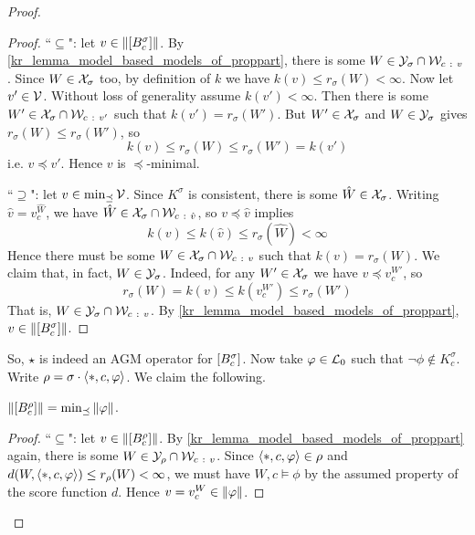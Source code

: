 \begin{proof}
\begin{proof}
            ``$\subseteq$": let $v \in \|{\left[{B^\sigma_c}\right]}\|$. By
            \cref{kr_lemma_model_based_models_of_proppart}, there is some $W \in
            \Y_\sigma \cap \W_{c\ :\  v}$. Since $W \in \mathcal{X}_\sigma$ too, by
            definition of $k$ we have $k(v) \le r_\sigma(W) < \infty$. Now let
            $v' \in \mathcal{V}$. Without loss of generality assume $k(v') < \infty$.
            Then there is some $W' \in \mathcal{X}_\sigma \cap \mathcal{W}_{c\ :\  v'}$ such that
            $k(v') = r_\sigma(W')$. But $W' \in \mathcal{X}_\sigma$ and $W \in
            \mathcal{Y}_\sigma$ gives $r_\sigma(W) \le r_\sigma(W')$, so
            \[
                k(v) \le r_\sigma(W) \le r_\sigma(W') = k(v')
            \]
            i.e. $v \preceq v'$. Hence $v$ is $\preceq$-minimal.

            ``$\supseteq$": let $v \in \min_{\preceq}\mathcal{V}$. Since $K^\sigma$
            is consistent, there is some $\hat{W} \in \mathcal{X}_\sigma$.  Writing
            $\hat{v} = v^{\hat{W}}_c$, we have $\hat{W} \in \mathcal{X}_\sigma \cap
            \mathcal{W}_{c\ :\ \hat{v}}$, so $v \preceq \hat{v}$ implies
            \[
                k(v)
                \le k(\hat{v})
                \le r_\sigma(\hat{W})
                < \infty
            \]
            Hence there must be some $W \in \X_\sigma \cap \W_{c\ :\ v}$ such
            that $k(v) = r_\sigma(W)$. We claim that, in fact, $W \in
            \mathcal{Y}_\sigma$. Indeed, for any $W' \in \mathcal{X}_\sigma$ we have $v \preceq
            v^{W'}_c$, so
            \[
                r_\sigma(W)
                = k(v)
                \le k(v^{W'}_c)
                \le r_\sigma(W')
            \]
            That is, $W \in \Y_\sigma \cap \W_{c\ :\  v}$. By
            \cref{kr_lemma_model_based_models_of_proppart}, $v \in
            \|{\left[{B^\sigma_c}\right]}\|$.

        \end{proof}

    So, $\star$ is indeed an AGM operator for $\left[{B^\sigma_c}\right]$. Now take
    $\varphi \in \mathcal{L}{}_0$ such that $\neg\phi \notin K^\sigma_c$. Write $\rho =
    \sigma \cdot \langle {\ast, c, \varphi} \rangle$. We claim the following.

        \begin{claim}
            \label{kr_claim_propmods_rho_min_models_of_phi}
            $\|{\left[{B^\rho_c}\right]}\| =
            \min\nolimits_{\preceq}{\|{\varphi}\|}$.
        \end{claim}
        \begin{proof}
            ``$\subseteq$": let $v \in \|{\left[{B^\rho_c}\right]}\|$.  By
            \cref{kr_lemma_model_based_models_of_proppart} again, there is some $W
            \in \mathcal{Y}_\rho \cap \mathcal{W}_{c\ :\  v}$. Since $\langle {\ast, c, \varphi} \rangle \in
            \rho$ and $d(W, \langle {\ast, c, \varphi} \rangle) \le r_\rho(W) < \infty$, we
            must have $W, c \models \phi$ by the assumed property of the score
            function $d$. Hence $v = v^W_c \in \|{\varphi}\|$.


\end{proof}
\end{proof}
